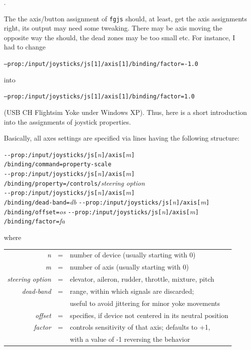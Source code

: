 .

The the axis/button assignment of \texttt{fgjs} should, at least, get the axis assignments right, its output may need some tweaking. There may be axis moving the opposite way the should, the dead zones may be too small etc. For instance, I had to change 

\texttt{--prop:/input/joysticks/js[1]/axis[1]/binding/factor=-1.0}

into

\texttt{--prop:/input/joysticks/js[1]/axis[1]/binding/factor=1.0}

(USB CH Flightsim Yoke under Windows XP). Thus, here is a short introduction into the assignments of joystick properties.

Basically, all axes settings are specified via lines having the following structure:
 \medskip

\noindent
\texttt{-$ $-prop:/input/joysticks/js[}\textit{n}\texttt{]/axis[}\textit{m}\texttt{]}\\
\texttt{/binding/command=property-scale}\\
\texttt{-$ $-prop:/input/joysticks/js[}\textit{n}\texttt{]/axis[}\textit{m}\texttt{]}\\
\texttt{/binding/property=/controls/}\textit{steering option}\\
\texttt{-$ $-prop:/input/joysticks/js[}\textit{n}\texttt{]/axis[}\textit{m}\texttt{]}\\
\texttt{/binding/dead-band=}\textit{db}
\texttt{-$ $-prop:/input/joysticks/js[}\textit{n}\texttt{]/axis[}\textit{m}\texttt{]}\\
\texttt{/binding/offset=}\textit{os}
\texttt{-$ $-prop:/input/joysticks/js[}\textit{n}\texttt{]/axis[}\textit{m}\texttt{]}\\
\texttt{/binding/factor=}\textit{fa}
\medskip

 \noindent
 where
 \medskip

\begin{tabular}{rcl}
 \textit{n} &=& number of device (usually starting with 0)\\
 \textit{m} &=& number of axis (usually starting with 0)\\
 \textit{steering option} &=& elevator, aileron, rudder, throttle, mixture, pitch\\
 \textit{dead-band} &=& range, within which signals are discarded;\\
                   && useful to avoid jittering for minor yoke movements\\
 \textit{offset} &=& specifies, if device not centered in its neutral position\\
  \textit{factor} &=& controls sensitivity of that axis; defaults to +1,\\ 
                 &&with a value of -1 reversing the behavior
  \end{tabular}
 \medskip

